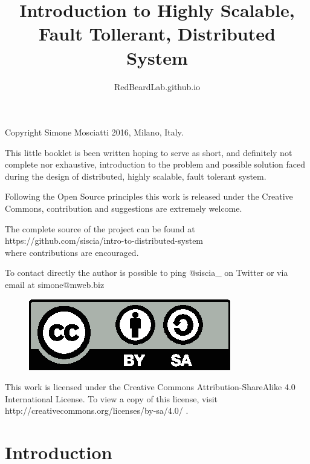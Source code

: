 \documentclass[12pt]{article} %
\title{{\rmfamily Introduction to Highly Scalable, Fault Tollerant, Distributed System}}
\author{RedBeardLab.github.io}
\date{} %
\begin{document}

\maketitle

\newpage

{Copyright Simone Mosciatti 2016, Milano, Italy.}

This little booklet is been written hoping to serve as short, and definitely not complete nor exhaustive,  introduction to the problem and possible solution faced during the design of distributed, highly scalable, fault tolerant system.

Following the Open Source principles this work is released under the Creative Commons, contribution and suggestions are extremely welcome. 

The complete source of the project can be found at \\
{\ttfamily https://github.com/siscia/intro-to-distributed-system} \\
where contributions are encouraged.

To contact directly the author is possible to ping {\ttfamily @siscia\_} on Twitter or via email at {\ttfamily simone@mweb.biz}

\vspace{\fill}

\begin{figure}[h]
	\centering
	\includegraphics{by-sa}
\end{figure}

{\small This work is licensed under the Creative Commons Attribution-ShareAlike 4.0 International License. To view a copy of this license, visit {\ttfamily http://creativecommons.org/licenses/by-sa/4.0/} .}

\section{Introduction}
\end{document}
